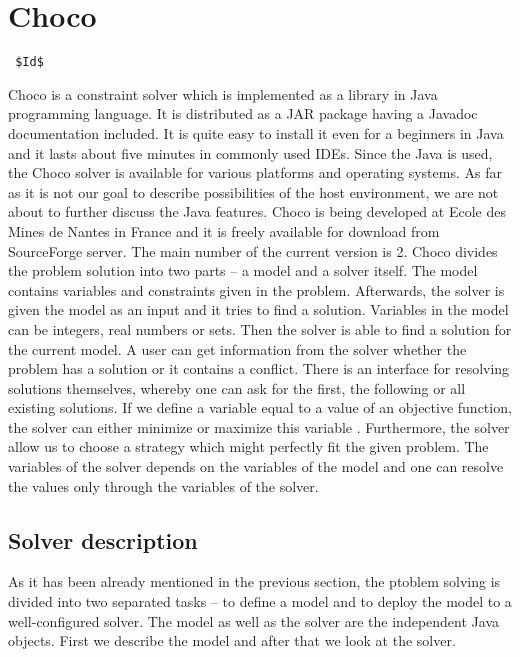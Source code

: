 \section{Choco}
\verb= $Id$ =

Choco is a constraint solver which is implemented as a library in Java programming language.
It is distributed as a JAR package having a Javadoc documentation included. It is quite easy
to install it even for a beginners in Java and it lasts about five minutes in commonly used
IDEs. Since the Java is used, the Choco solver is available for various platforms
and operating systems. As far as it is not our goal to describe possibilities of the host environment, 
we are not about to further discuss the Java features. Choco is being developed
at Ecole des Mines de Nantes in France and it is freely available for download from 
SourceForge server. The main number of the current version is 2. Choco divides the problem solution
into two parts -- a model and a solver itself. The model contains variables and constraints given 
in the problem. Afterwards, the solver is given the model as an input and it tries to find a solution. 
Variables in the model can be integers, real numbers or sets. Then the solver is able to
find a solution for the current model. A user can get information from the solver whether the 
problem has a solution or it contains a conflict. There is an interface for resolving solutions themselves, 
whereby one can ask for the first, the following or all existing solutions. If we define a variable
equal to a value of an objective function, the solver can either minimize or maximize this variable .
Furthermore, the solver allow us to choose a strategy which might perfectly fit the given problem.
The variables of the solver depends on the variables of the model and one can resolve the values only through
the variables of the solver.

\subsection{Solver description}
As it has been already mentioned in the previous section, the ptoblem solving is divided
into two separated tasks -- to define a model and to deploy the model to a well-configured solver.
The model as well as the solver are the independent Java objects. First we describe the 
model and after that we look at the solver. 

